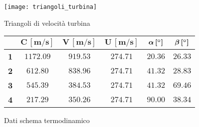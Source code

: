 \vspace{5pt}
\begin{minipage}{0.5\linewidth}
    \centering
    \captionsetup{type=figure}
    \texttt{[image: triangoli\_turbina]}
    \caption{Triangoli di velocità turbina}
    \label{fig:triangoli_turbina}
\end{minipage}\hfill
\begin{minipage}{0.5\linewidth}
    \centering
    \captionsetup{type=table}
    \renewcommand{\arraystretch}{2}
    \setlength\extrarowheight{-1pt}
    \begin{tabular}{|c|c|c|c|c|c|}
        \hline
        & $\bm{C \, [m/s]}$ & $\bm{V \, [m/s]}$ & $\bm{U \, [m/s]}$ & $\bm{\alpha \, [\degree]}$ & $\bm{\beta \, [\degree]}$ \\
        \hline
        \textbf{1} & $1172.09$ & $919.53$ & $274.71$ & $20.36$ & $26.33$ \\
        \hline
        \textbf{2} & $612.80$ & $838.96$ & $274.71$ & $41.32$ & $28.83$ \\
        \hline
        \textbf{3} & $545.39$ & $384.53$ & $274.71$ & $41.32$ & $69.46$ \\
        \hline
        \textbf{4} & $217.29$ & $350.26$ & $274.71$ & $90.00$ & $38.34$ \\
        \hline
    \end{tabular}
    \caption{Dati schema termodinamico}
    \label{table:dati_triangoli_turbina}
\end{minipage}